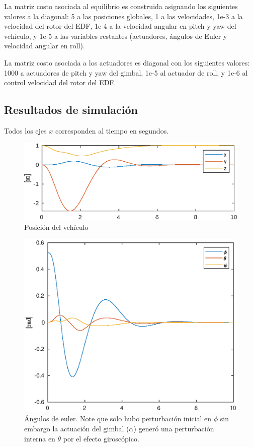 La matriz costo asociada al equilibrio es construida asignando los siguientes valores a la diagonal: 5 a las posiciones globales, 1 a las velocidades, 1e-3 a la velocidad del rotor del EDF, 1e-4 a la velocidad angular en pitch y yaw del vehículo, y 1e-5 a las variables restantes (actuadores, ángulos de Euler y velocidad angular en roll).

La matriz costo asociada a los actuadores es diagonal con los siguientes valores: 1000 a actuadores de pitch y yaw del gimbal, 1e-5 al actuador de roll, y 1e-6 al control velocidad del rotor del EDF.


\subsection{Resultados de simulación}

Todos los ejes $x$ corresponden al tiempo en segundos.

\begin{figure}[!ht]
    \centering
    \includegraphics[width=0.8\linewidth]{fig/pos_edf}
    \caption{Posición del vehículo}
    \label{fig:pos_edf}
\end{figure}

\begin{figure}[!ht]
    \centering
    \includegraphics[width=0.6\linewidth]{fig/eulerang_edf}
    \caption{Ángulos de euler. Note que solo hubo perturbación inicial en $\phi$ sin embargo la actuación del gimbal ($\alpha$) generó una perturbación interna en $\theta$ por el efecto giroscópico.}
    \label{fig:eulerang_edf}
\end{figure}

